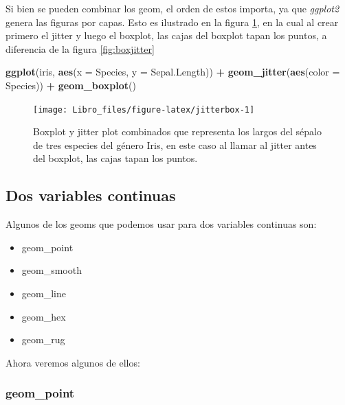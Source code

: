 \documentclass[]{book}
\newenvironment{Shaded}{\begin{snugshade}}{\end{snugshade}}
\newcommand{\DataTypeTok}[1]{\textcolor[rgb]{0.13,0.29,0.53}{#1}}
\newcommand{\KeywordTok}[1]{\textcolor[rgb]{0.13,0.29,0.53}{\textbf{#1}}}
\newcommand{\NormalTok}[1]{#1}
\newcommand{\OperatorTok}[1]{\textcolor[rgb]{0.81,0.36,0.00}{\textbf{#1}}}
\newcommand{\StringTok}[1]{\textcolor[rgb]{0.31,0.60,0.02}{#1}}
\providecommand{\tightlist}{%
  \setlength{\itemsep}{0pt}\setlength{\parskip}{0pt}}
\begin{document}
Si bien se pueden combinar los geom, el orden de estos importa, ya que
\emph{ggplot2} genera las figuras por capas. Esto es ilustrado en la
figura \ref{fig:jitterbox}, en la cual al crear primero el jitter y
luego el boxplot, las cajas del boxplot tapan los puntos, a diferencia
de la figura \ref{fig:boxjitter}

\begin{Shaded}
\begin{Highlighting}[]
\KeywordTok{ggplot}\NormalTok{(iris, }\KeywordTok{aes}\NormalTok{(}\DataTypeTok{x =}\NormalTok{ Species, }\DataTypeTok{y =}\NormalTok{ Sepal.Length)) }\OperatorTok{+}\StringTok{ }\KeywordTok{geom_jitter}\NormalTok{(}\KeywordTok{aes}\NormalTok{(}\DataTypeTok{color =}\NormalTok{ Species)) }\OperatorTok{+}\StringTok{ }
\StringTok{    }\KeywordTok{geom_boxplot}\NormalTok{()}
\end{Highlighting}
\end{Shaded}

\begin{figure}

{\centering \texttt{[image: Libro\_files/figure-latex/jitterbox-1]} 

}

\caption{Boxplot y jitter plot combinados que representa los largos del sépalo de tres especies del género Iris, en este caso al llamar al jitter antes del boxplot, las cajas tapan los puntos.}\label{fig:jitterbox}
\end{figure}

\hypertarget{dos-variables-continuas}{%
\subsection{Dos variables continuas}\label{dos-variables-continuas}}

Algunos de los geoms que podemos usar para dos variables continuas son:

\begin{itemize}
\tightlist
\item
  geom\_point
\item
  geom\_smooth
\item
  geom\_line
\item
  geom\_hex
\item
  geom\_rug
\end{itemize}

Ahora veremos algunos de ellos:

\hypertarget{geom_point}{%
\subsubsection{geom\_point}\label{geom_point}}
\end{document}
